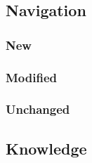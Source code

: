 \documentclass[main.tex]{subfiles}
\begin{document}
                \subsection{Navigation}
                \subsubsection{New}
                \subsubsection{Modified}
                \subsubsection{Unchanged}
                \subsection{Knowledge}
\end{document}
